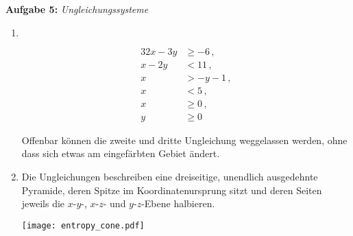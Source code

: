 \textbf{Aufgabe 5: }\emph{Ungleichungssysteme}
\begin{enumerate}[label=(\alph*), labelindent=1em,labelsep=0.5cm]
\item$~$\\[-0.4cm]
\begin{minipage}{0.2\textwidth}
    \begin{alignat*}{3}
        2x-3y&\geq -6\,,\\
        x-2y&< 11\,,\\
        x&>-y-1\,,\\
        x&<5\,,\\
        x&\geq 0\,,\\
        y&\geq 0
    \end{alignat*}
\end{minipage}
\begin{minipage}{0.8\textwidth}
    \centering
\end{minipage}
Offenbar können die zweite und dritte Ungleichung weggelassen werden, ohne dass sich etwas am eingefärbten Gebiet ändert. 

\item Die Ungleichungen beschreiben eine dreiseitige, unendlich ausgedehnte Pyramide, deren Spitze im Koordinatenursprung sitzt und deren Seiten jeweils die $x$-$y$-, $x$-$z$- und $y$-$z$-Ebene halbieren.\\
\begin{center}
\texttt{[image: entropy\_cone.pdf]}
\end{center}

\end{enumerate}